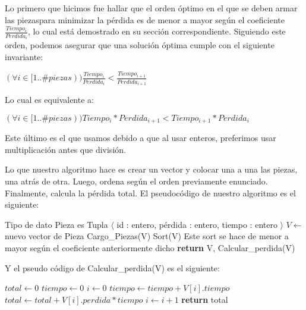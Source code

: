 Lo primero que hicimos fue hallar que el orden óptimo en el que se deben armar las piezaspara minimizar la pérdida es de menor a mayor según el coeficiente $\frac{Tiempo_i}{Perdida_i}$, lo cual está demostrado en su sección correspondiente. Siguiendo este orden, podemos asegurar que una solución óptima cumple con el siguiente invariante:

\begin{center}

$(\forall i \in [1..\#{piezas})) \frac{Tiempo_i}{Perdida_i} < \frac{Tiempo_{i+1}}{Perdida_{i+1}}$
 
\end{center}

Lo cual es equivalente a:

\begin{center}

$(\forall i \in [1..\#{piezas})) Tiempo_i * Perdida_{i+1} < Tiempo_{i+1} * Perdida_i$
 
\end{center}

Este último es el que usamos debido a que al usar enteros, preferimos usar multiplicación antes que división.

Lo que nuestro algoritmo hace es crear un vector y colocar una a una las piezas, una atrás de otra. Luego, ordena según el orden previamente enunciado. Finalmente, calcula la pérdida total. El pseudocódigo de nuestro algoritmo es el siguiente:

\renewcommand{\algorithmiccomment}[1]{\hskip2em$//$ #1}

\begin{pseudo}
\State Tipo de dato Pieza es Tupla $\langle$ id : entero, pérdida : entero, tiempo : entero $\rangle$
        \State $V \leftarrow$ nuevo vector de Pieza %
        \State Cargo\_Piezas(V) %
        \State Sort(V) %
        \Comment Este sort se hace de menor a mayor según el coeficiente anteriormente dicho
        \State \textbf{return} V, Calcular\_perdida(V) %
    \EndProcedure
\end{pseudo}

Y el pseudo código de Calcular\_perdida(V) es el siguiente:

\begin{pseudo}
      \State $total \leftarrow 0$
      \State $tiempo \leftarrow 0$
      \State $i \leftarrow 0$
	\State $tiempo \leftarrow tiempo + V[i].tiempo$
	\State $total \leftarrow total + V[i].perdida * tiempo$
	\State $i \leftarrow  i + 1$
      \EndWhile
      \State \textbf{return} total
  \EndProcedure
\end{pseudo}
